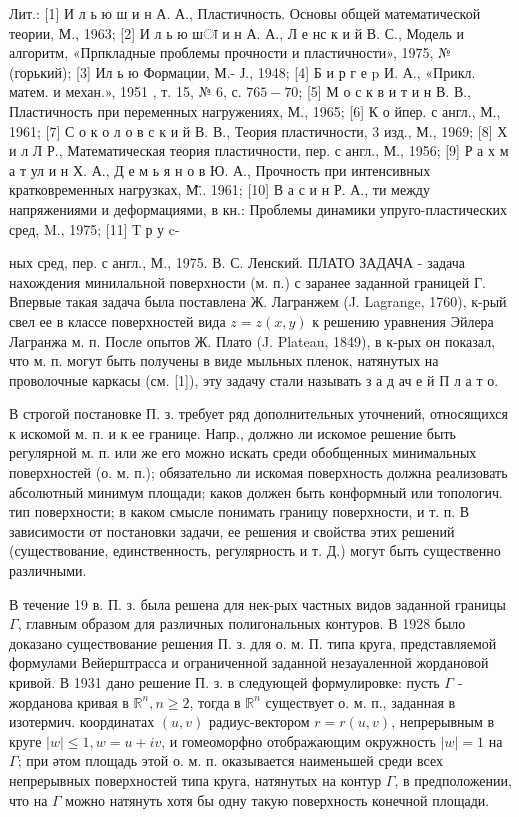 \documentclass[10pt]{article}
\begin{document}
Лит.: [1] И л ь ю ш и н А. А., Пластичность. Основы общей математической теории, М., 1963; [2] И л ь ю шा и н А. А., Л е нс к и й В. С., Модель и алгоритм, «Прпкладные проблемы прочности и пластичности», 1975, № (горький); [3] Ил ь ю Формации, М.- Ј., 1948; [4] Б и р г е p И. А., «Прикл. матем. и механ.», 1951 , т. 15, № 6, с. $765-70$; [5] М о с к в и т и н В. В., Пластичность при переменных нагружениях, М., 1965; [6] К о йпер. с англ., М., 1961; [7] С о к о л о в с к и й В. В., Теория пластичности, 3 изд., М., 1969; [8] Х и л Л Р., Математическая теория пластичности, пер. с англ., М., 1956; [9] Р а х м а т ул и н Х. А., Д е м ь я н о в Ю. А., Прочность при интенсивных кратковременных нагрузках, М.̈̈. 1961; [10] В а с и н Р. А., ти между напряжениями и деформациями, в кн.: Проблемы динамики упруго-пластических сред, M., 1975; [11] Т р у c-



ных сред, пер. с англ., М., 1975. В. С. Ленский. ПЛАТО ЗАДАЧА - задача нахождения минилальной поверхности (м. п.) с заранее заданной границей $Г$. Впервые такая задача была поставлена Ж. Лагранжем (J. Lagrange, 1760), к-рый свел ее в классе поверхностей вида $z=z(x, y)$ к решению уравнения Эйлера Лагранжа м. п. После опытов Ж. Плато (J. Plateau, 1849), в к-рых он показал, что м. п. могут быть получены в виде мыльных пленок, натянутых на проволочные каркасы (см. [1]), эту задачу стали называть з а д ач е й П л а т о.



В строгой постановке П. з. требует ряд дополнительных уточнений, относящихся к искомой м. п. и к ее границе. Напр., должно ли искомое решение быть регулярной м. п. или же его можно искать среди обобщенных минимальных поверхностей (о. м. п.); обязательно ли искомая поверхность должна реализовать абсолютный минимум площади; каков должен быть конформный или топологич. тип поверхности; в каком смысле понимать границу поверхности, и т. п. В зависимости от постановки задачи, ее решения и свойства этих решений (существование, единственность, регулярность и т. Д.) могут быть существенно различными.



В течение 19 в. П. з. была решена для нек-рых частных видов заданной границы $\Gamma$, главным образом для различных полигональных контуров. В 1928 было доказано существование решения П. з. для о. м. П. типа круга, представляемой формулами Вейерштрасса и ограниченной заданной незауаленной жордановой кривой. В 1931 дано решение П. з. в следующей формулировке: пусть $\Gamma$ - жорданова кривая в $\mathbb{R}^{n}, n \geqslant 2$, тогда в $\mathbb{R}^{n}$ существует о. м. п., заданная в изотермич. координатах $(u, v)$ радиус-вектором $r=r(u, v)$, непрерывным в круге $|w| \leqslant 1, w=u+i v$, и гомеоморфно отображающим окружность $|w|=1$ на $\Gamma$; при әтом площадь этой о. м. п. оказывается наименьшей среди всех непрерывных поверхностей типа круга, натянутых на контур $\Gamma$, в предположении, что на $\Gamma$ можно натянуть хотя бы одну такую поверхность конечной площади.
\end{document}
